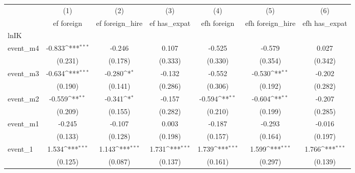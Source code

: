{
\def\sym#1{\ifmmode^{#1}\else\(^{#1}\)\fi}
\begin{tabular}{l*{6}{c}}
\hline\hline
            &\multicolumn{1}{c}{(1)}&\multicolumn{1}{c}{(2)}&\multicolumn{1}{c}{(3)}&\multicolumn{1}{c}{(4)}&\multicolumn{1}{c}{(5)}&\multicolumn{1}{c}{(6)}\\
            &\multicolumn{1}{c}{ef foreign}&\multicolumn{1}{c}{ef foreign\_hire}&\multicolumn{1}{c}{ef has\_expat}&\multicolumn{1}{c}{efh foreign}&\multicolumn{1}{c}{efh foreign\_hire}&\multicolumn{1}{c}{efh has\_expat}\\
\hline
lnIK        &                     &                     &                     &                     &                     &                     \\
event\_m4    &      -0.833\sym{***}&      -0.246         &       0.107         &      -0.525         &      -0.579         &       0.027         \\
            &     (0.231)         &     (0.178)         &     (0.333)         &     (0.330)         &     (0.354)         &     (0.342)         \\
[1em]
event\_m3    &      -0.634\sym{***}&      -0.280\sym{*}  &      -0.132         &      -0.552         &      -0.530\sym{**} &      -0.202         \\
            &     (0.190)         &     (0.141)         &     (0.286)         &     (0.306)         &     (0.192)         &     (0.282)         \\
[1em]
event\_m2    &      -0.559\sym{**} &      -0.341\sym{*}  &      -0.157         &      -0.594\sym{**} &      -0.604\sym{**} &      -0.207         \\
            &     (0.209)         &     (0.155)         &     (0.282)         &     (0.210)         &     (0.199)         &     (0.285)         \\
[1em]
event\_m1    &      -0.245         &      -0.107         &       0.003         &      -0.187         &      -0.293         &      -0.016         \\
            &     (0.133)         &     (0.128)         &     (0.198)         &     (0.157)         &     (0.164)         &     (0.197)         \\
[1em]
event\_1     &       1.534\sym{***}&       1.143\sym{***}&       1.731\sym{***}&       1.739\sym{***}&       1.599\sym{***}&       1.766\sym{***}\\
            &     (0.125)         &     (0.087)         &     (0.137)         &     (0.161)         &     (0.297)         &     (0.139)         \\

\end{tabular}}
